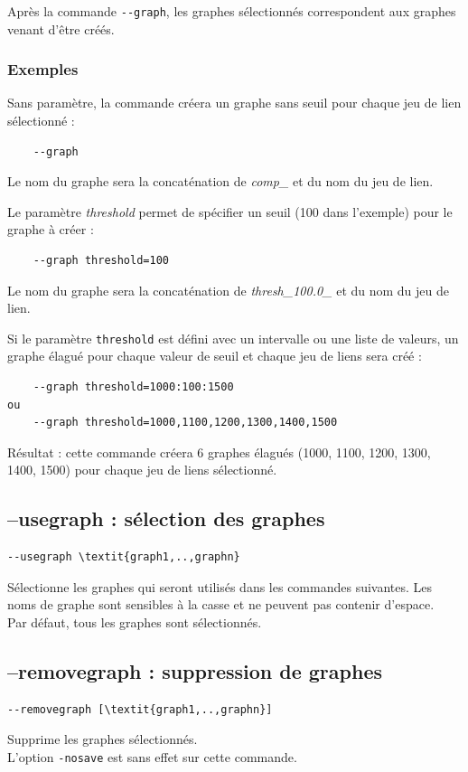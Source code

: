 \documentclass[a4paper,10pt]{report}
\begin{document}
Après la commande \verb|--graph|, les graphes sélectionnés correspondent aux graphes venant d'être créés.

\subsubsection{Exemples}
Sans paramètre, la commande créera un graphe sans seuil pour chaque jeu de lien sélectionné :
\begin{Verbatim}
	--graph
\end{Verbatim}
Le nom du graphe sera la concaténation de \textit{comp\_} et du nom du jeu de lien.

Le paramètre \textit{threshold} permet de spécifier un seuil (100 dans l'exemple) pour le graphe à créer :
\begin{Verbatim}
	--graph threshold=100
\end{Verbatim}
Le nom du graphe sera la concaténation de  \textit{thresh\_100.0\_} et du nom du jeu de lien.

Si le paramètre \verb|threshold| est défini avec un intervalle ou une liste de valeurs, un graphe élagué pour chaque valeur de seuil et chaque jeu de liens sera créé :
\begin{Verbatim}
	--graph threshold=1000:100:1500
ou
	--graph threshold=1000,1100,1200,1300,1400,1500
\end{Verbatim}
Résultat : cette commande créera 6 graphes élagués (1000, 1100, 1200, 1300, 1400, 1500) pour chaque jeu de liens sélectionné.


\subsection{--usegraph : sélection des graphes}
\label{usegraph}
\begin{Verbatim}[commandchars=\\\{\}]
--usegraph \textit{graph1,..,graphn}
\end{Verbatim}
Sélectionne les graphes qui seront utilisés dans les commandes suivantes.
Les noms de graphe sont sensibles à la casse et ne peuvent pas contenir d'espace.\\
Par défaut, tous les graphes sont sélectionnés.

\subsection{--removegraph : suppression de graphes}
\begin{Verbatim}[commandchars=\\\{\}]
--removegraph [\textit{graph1,..,graphn}]
\end{Verbatim}
Supprime les graphes sélectionnés.\\
L'option \verb|-nosave| est sans effet sur cette commande.
\end{document}
